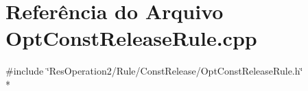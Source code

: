 \section{Referência do Arquivo Opt\+Const\+Release\+Rule.\+cpp}
\label{_opt_const_release_rule_8cpp}
{\ttfamily \#include \char`\"{}Res\+Operation2/\+Rule/\+Const\+Release/\+Opt\+Const\+Release\+Rule.\+h\char`\"{}}\\*
